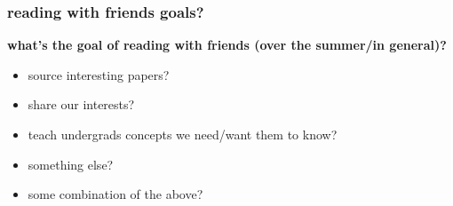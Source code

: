 \documentclass[presentation]{subfiles}
\begin{document}
\begin{frame}\frametitle{reading with friends goals?}

\textbf{\large what's the \alert{goal} of reading with friends (over the {summer}/in general)?}

\begin{itemize}
  \item source interesting papers?
  \item share our interests?
  \item teach undergrads concepts we need/want them to know?
  \item something else?
  \item some combination of the above?
\end{itemize}

\end{frame}
\end{document}
